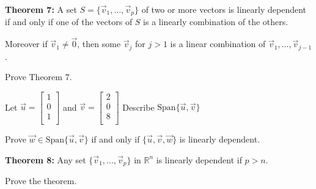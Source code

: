 \documentclass[12pt,letterpaper]{article}
\begin{document}
\begin{enumerate}
\vfill

{\bf Theorem 7:} A set $S=\{ \vec{v}_1, \dots, \vec{v}_p \}$ of two or more vectors is linearly dependent if and only if one of the vectors of $S$ is a linearly combination of the others.

Moreover if $\vec{v}_1\neq \vec{0}$, then some $\vec{v}_j$ for $j>1$ is a linear combination of $\vec{v}_1, \dots, \vec{v}_{j-1}$.

\Problem Prove Theorem 7.

\vfill

\newpage

\Problem Let $\vec{u}=\begin{bmatrix} 1\\ 0\\ 1\\ \end{bmatrix}$ and $\vec{v} = \begin{bmatrix} 2 \\ 0 \\ 8\\ \end{bmatrix}$
\Part Describe $\text{Span}\{\vec{u}, \vec{v}\}$

\vfill

\Part Prove $\vec{w} \in \text{Span}\{\vec{u}, \vec{v}\}$ if and only if $\{ \vec{u}, \vec{v}, \vec{w} \}$ is linearly dependent.

\vfill
\vfill

{\bf Theorem 8:} Any set $\{ \vec{v}_1, \dots, \vec{v}_p \}$ in $\mathbb{R}^n$ is linearly dependent if $p>n$.

\Problem Prove the theorem.

\vfill
\vfill
\vfill 
\end{enumerate}


\newpage
{}%
\lhead{}
\rhead{}
\thispagestyle{fancy}
\end{document}
